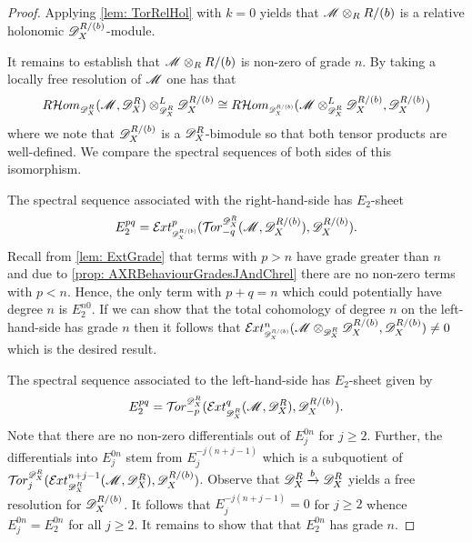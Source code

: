 \begin{proof}
  Applying \cref{lem: TorRelHol} with $k=0$ yields that $\mathscr{M} \otimes_R R/(b)$ is a relative holonomic $\mathscr{D}_X^{R/(b)}$-module.

  It remains to establish that $\mathscr{M} \otimes_R R/(b)$ is non-zero of grade $n$.
  By taking a locally free resolution of $\mathscr{M}$ one has that
  $$R\Hom_{\scaleto{\D_X^R}{8pt}}(\M,\D_X^R)\otimes_{\scaleto{\D_X^R}{8pt}}^L \D_X^{R/(b)} \cong R \Hom_{\scaleto{\D_X^{R/(b)}}{8pt}}(\M\otimes_{\scaleto{\D_X^R}{8pt}}^L \D_X^{R/(b)}, \D_X^{R/(b)}) $$
  where we note that $\mathscr{D}_X^{R/(b)}$ is a $\mathscr{D}_X^{R}$-bimodule so that both tensor products are well-defined.
  We compare the spectral sequences of both sides of this isomorphism.

  The spectral sequence associated with the right-hand-side has $E_2$-sheet
  $$E^{pq}_2 = \Ex{\D_X^{R/(b)}}{p}(\Tr{\D_X^R}{-q}(\M, \D_X^{R/(b)}), \D_X^{R/(b)}).$$
  Recall from \cref{lem: ExtGrade} that terms with $p>n$ have grade greater than $n$ and due to \cref{prop: AXRBehaviourGradesJAndChrel} there are no non-zero terms with $p<n$.
  Hence, the only term with $p+q = n$ which could potentially have degree $n$ is $E^{n0}_2$.
  If we can show that the total cohomology of degree $n$ on the left-hand-side has grade $n$ then it follows that $\Ex{\D_X^{R/(b)}}{n}(\M\otimes_{\scaleto{\D_X^R}{8pt}} \D_X^{R/(b)}, \D_X^{R/(b)}) \neq 0$ which is the desired result.

  The spectral sequence associated to the left-hand-side has $E_2$-sheet given by
  $$E_2^{pq} =\Tr{\D_X^R}{-p}( \Ex{\D_X^R}{q}(\M,\D_X^R), \D_X^{R/(b)}).$$
  Note that there are no non-zero differentials out of $E_j^{0n}$ for $j\geq 2$.
  Further, the differentials into $E^{0n}_j$ stem from $E^{-j(n+j-1)}_j$ which is a subquotient of $\Tr{\D_X^R}{j}(\Ex{\D_X^R}{n+j-1}(\M,\ab \D_X^R)\ab , \D_X^{R/(b)})$.
  Observe that $\mathscr{D}_X^R \xrightarrow{b} \mathscr{D}_X^R $ yields a free resolution for $\mathscr{D}_X^{R/(b)}$.
  It follows that $E^{-j(n+j-1)}_j=0$ for $j\geq 2$ whence $E_j^{0n} = E_2^{0n}$ for all $j\geq 2$.
  It remains to show that that $E_2^{0n}$ has grade $n$.


\end{proof}
